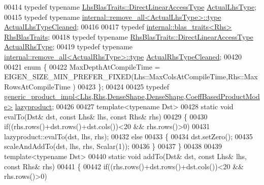 \begin{DoxyCode}
00414   \textcolor{keyword}{typedef} \textcolor{keyword}{typename} \hyperlink{class_eigen_1_1internal_1_1_tensor_lazy_evaluator_writable}{LhsBlasTraits::DirectLinearAccessType} 
      \hyperlink{class_eigen_1_1internal_1_1_tensor_lazy_evaluator_writable}{ActualLhsType};
00415   \textcolor{keyword}{typedef} \textcolor{keyword}{typename} \hyperlink{group___sparse_core___module}{internal::remove\_all<ActualLhsType>::type} 
      \hyperlink{group___sparse_core___module}{ActualLhsTypeCleaned};
00416 
00417   \textcolor{keyword}{typedef} \hyperlink{struct_eigen_1_1internal_1_1blas__traits}{internal::blas\_traits<Rhs>} \hyperlink{struct_eigen_1_1internal_1_1blas__traits}{RhsBlasTraits};
00418   \textcolor{keyword}{typedef} \textcolor{keyword}{typename} \hyperlink{class_eigen_1_1internal_1_1_tensor_lazy_evaluator_writable}{RhsBlasTraits::DirectLinearAccessType} 
      \hyperlink{class_eigen_1_1internal_1_1_tensor_lazy_evaluator_writable}{ActualRhsType};
00419   \textcolor{keyword}{typedef} \textcolor{keyword}{typename} \hyperlink{group___sparse_core___module}{internal::remove\_all<ActualRhsType>::type} 
      \hyperlink{group___sparse_core___module}{ActualRhsTypeCleaned};
00420 
00421   \textcolor{keyword}{enum} \{
00422     MaxDepthAtCompileTime = EIGEN\_SIZE\_MIN\_PREFER\_FIXED(Lhs::MaxColsAtCompileTime,Rhs::MaxRowsAtCompileTime
      )
00423   \};
00424 
00425   \textcolor{keyword}{typedef} 
      \hyperlink{struct_eigen_1_1internal_1_1generic__product__impl_3_01_lhs_00_01_rhs_00_01_dense_shape_00_01_de59d3ba8d1712b00b0be8f7c4d1d76ce2}{generic\_product\_impl<Lhs,Rhs,DenseShape,DenseShape,CoeffBasedProductMode>}
       \hyperlink{struct_eigen_1_1internal_1_1generic__product__impl_3_01_lhs_00_01_rhs_00_01_dense_shape_00_01_de59d3ba8d1712b00b0be8f7c4d1d76ce2}{lazyproduct};
00426 
00427   \textcolor{keyword}{template}<\textcolor{keyword}{typename} Dst>
00428   \textcolor{keyword}{static} \textcolor{keywordtype}{void} evalTo(Dst& dst, \textcolor{keyword}{const} Lhs& lhs, \textcolor{keyword}{const} Rhs& rhs)
00429   \{
00430     \textcolor{keywordflow}{if}((rhs.rows()+dst.rows()+dst.cols())<20 && rhs.rows()>0)
00431       lazyproduct::evalTo(dst, lhs, rhs);
00432     \textcolor{keywordflow}{else}
00433     \{
00434       dst.setZero();
00435       scaleAndAddTo(dst, lhs, rhs, Scalar(1));
00436     \}
00437   \}
00438 
00439   \textcolor{keyword}{template}<\textcolor{keyword}{typename} Dst>
00440   \textcolor{keyword}{static} \textcolor{keywordtype}{void} addTo(Dst& dst, \textcolor{keyword}{const} Lhs& lhs, \textcolor{keyword}{const} Rhs& rhs)
00441   \{
00442     \textcolor{keywordflow}{if}((rhs.rows()+dst.rows()+dst.cols())<20 && rhs.rows()>0)

\end{DoxyCode}
